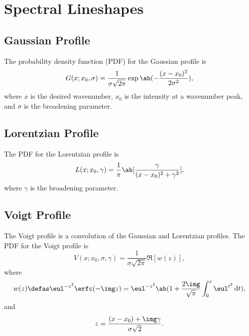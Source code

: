 \chapter{Spectral Lineshapes}
\label{c:spectral_lineshapes}

\section{Gaussian Profile}
\label{s:gaussian_profile}

The probability density function (PDF) for the Gaussian profile is
\begin{equation*}
    G(x; x_{0}, \sigma) = \frac{1}{\sigma\sqrt{2\pi}}\exp\ab(-\frac{(x - x_{0})^{2}}{2\sigma^{2}}),
\end{equation*}
where $x$ is the desired wavenumber, $x_{0}$ is the intensity at a wavenumber peak, and $\sigma$ is the broadening parameter.

\section{Lorentzian Profile}
\label{s:lorentzian_profile}

The PDF for the Lorentzian profile is
\begin{equation*}
    L(x; x_{0}, \gamma) = \frac{1}{\pi}\ab[\frac{\gamma}{(x - x_{0})^{2} + \gamma^{2}}],
\end{equation*}
where $\gamma$ is the broadening parameter.

\section{Voigt Profile}
\label{s:voigt_profile}

The Voigt profile is a convolution of the Gaussian and Lorentzian profiles. The PDF for the Voigt profile is
\begin{equation*}
    V(x; x_{0}, \sigma, \gamma) = \frac{1}{\sigma\sqrt{2\pi}}\Re[w(z)],
\end{equation*}
where
\begin{equation*}
    w(z) \defas \eul^{-z^{2}}\erfc(-\img z) = \eul^{-z^{2}}\ab(1 +
    \frac{2\img}{\sqrt{\pi}}\int_{0}^{z} \eul^{t^{2}} \odif{t}),
\end{equation*}
and
\begin{equation*}
    z = \frac{(x - x_{0}) + \img\gamma}{\sigma\sqrt{2}}.
\end{equation*}


